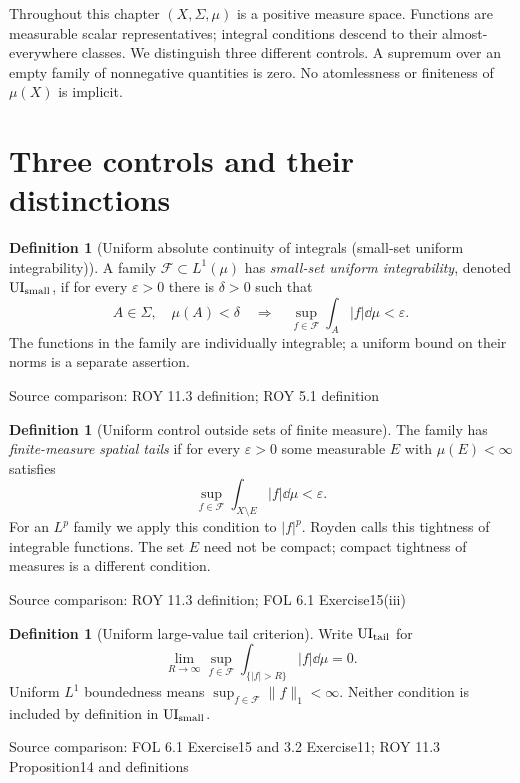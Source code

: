 \documentclass[11pt,oneside,openany]{book}
\theoremstyle{definition}
\newtheorem{definition}[theorem]{Definition}
\theoremstyle{remark}
\newcommand{\eps}{\varepsilon}\newcommand{\ee}{\varepsilon}
\newcommand{\family}[1]{}
\newcommand{\source}[1]{\par\begingroup\small\sffamily\color{black!65}Source comparison: #1\par\endgroup}
\begin{document}
Throughout this chapter $(X,\Sigma,\mu)$ is a positive measure space. Functions are measurable scalar representatives; integral conditions descend to their almost-everywhere classes. We distinguish three different controls. A supremum over an empty family of nonnegative quantities is zero. No atomlessness or finiteness of $\mu(X)$ is implicit.

\section{Three controls and their distinctions}

\begin{definition}[Uniform absolute continuity of integrals (small-set uniform integrability)]\family{D11.17.uniform_absolute_continuity}\label{d11:17:uniform-absolute-continuity}
A family $\mathcal F\subset L^1(\mu)$ has \emph{small-set uniform integrability}, denoted $\mathrm{UI}_{\rm small}$, if for every $\eps>0$ there is $\delta>0$ such that
\[ A\in\Sigma,\quad \mu(A)<\delta\quad\Longrightarrow\quad
 \sup_{f\in\mathcal F}\int_A|f|\dd\mu<\eps.\]
The functions in the family are individually integrable; a uniform bound on their norms is a separate assertion.
\end{definition}
\source{ROY 11.3 definition; ROY 5.1 definition}

\begin{definition}[Uniform control outside sets of finite measure]\family{D11.17.finite_measure_tails}\label{d11:17:finite-measure-tails}
The family has \emph{finite-measure spatial tails} if for every $\eps>0$ some measurable $E$ with $\mu(E)<\infty$ satisfies
\[\sup_{f\in\mathcal F}\int_{X\setminus E}|f|\dd\mu<\eps.\]
For an $L^p$ family we apply this condition to $|f|^p$. Royden calls this tightness of integrable functions. The set $E$ need not be compact; compact tightness of measures is a different condition.
\end{definition}
\source{ROY 11.3 definition; FOL 6.1 Exercise15(iii)}

\begin{definition}[Uniform large-value tail criterion]\family{D11.17.amplitude_tails}\label{d11:17:amplitude-tails}
Write $\mathrm{UI}_{\rm tail}$ for
\[\lim_{R\to\infty}\sup_{f\in\mathcal F}\int_{\{|f|>R\}}|f|\dd\mu=0.\]
Uniform $L^1$ boundedness means $\sup_{f\in\mathcal F}\|f\|_1<\infty$. Neither condition is included by definition in $\mathrm{UI}_{\rm small}$.
\end{definition}
\source{FOL 6.1 Exercise15 and 3.2 Exercise11; ROY 11.3 Proposition14 and definitions}
\end{document}
